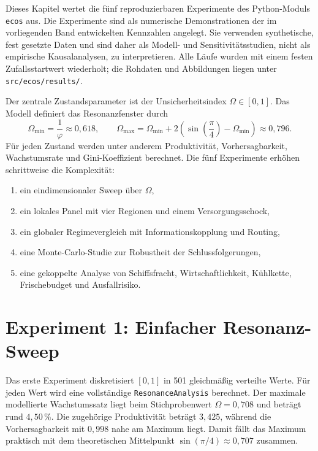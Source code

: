 \documentclass[a4paper, 12pt, twoside, openright]{report}
\theoremstyle{definition}
\theoremstyle{definition}
\begin{document}
Dieses Kapitel wertet die fünf reproduzierbaren Experimente des Python-Moduls
\texttt{ecos} aus. Die Experimente sind als numerische Demonstrationen der im
vorliegenden Band entwickelten Kennzahlen angelegt. Sie verwenden synthetische,
fest gesetzte Daten und sind daher als Modell- und Sensitivitätsstudien, nicht
als empirische Kausalanalysen, zu interpretieren. Alle Läufe wurden mit einem
festen Zufallsstartwert wiederholt; die Rohdaten und Abbildungen liegen unter
\texttt{src/ecos/results/}.

Der zentrale Zustandsparameter ist der Unsicherheitsindex $\Omega \in [0,1]$.
Das Modell definiert das Resonanzfenster durch
\begin{equation}
  \Omega_{\min}=\frac{1}{\varphi}\approx 0{,}618,
  \qquad
  \Omega_{\max}=\Omega_{\min}+2
  \left(\sin\!\left(\frac{\pi}{4}\right)-\Omega_{\min}\right)
  \approx 0{,}796.
\end{equation}
Für jeden Zustand werden unter anderem Produktivität, Vorhersagbarkeit,
Wachstumsrate und Gini-Koeffizient berechnet. Die fünf Experimente erhöhen
schrittweise die Komplexität:
\begin{enumerate}
  \item ein eindimensionaler Sweep über $\Omega$,
  \item ein lokales Panel mit vier Regionen und einem Versorgungsschock,
  \item ein globaler Regimevergleich mit Informationskopplung und Routing,
  \item eine Monte-Carlo-Studie zur Robustheit der Schlussfolgerungen,
  \item eine gekoppelte Analyse von Schiffsfracht, Wirtschaftlichkeit,
    Kühlkette, Frischebudget und Ausfallrisiko.
\end{enumerate}

\section{Experiment 1: Einfacher Resonanz-Sweep}

Das erste Experiment diskretisiert $[0,1]$ in 501 gleichmäßig verteilte Werte.
Für jeden Wert wird eine vollständige \texttt{ResonanceAnalysis} berechnet.
Der maximale modellierte Wachstumssatz liegt beim Stichprobenwert
$\Omega=0{,}708$ und beträgt rund $4{,}50\,\%$. Die zugehörige Produktivität
beträgt $3{,}425$, während die Vorhersagbarkeit mit $0{,}998$ nahe am Maximum
liegt. Damit fällt das Maximum praktisch mit dem theoretischen Mittelpunkt
$\sin(\pi/4)\approx0{,}707$ zusammen.
\end{document}
